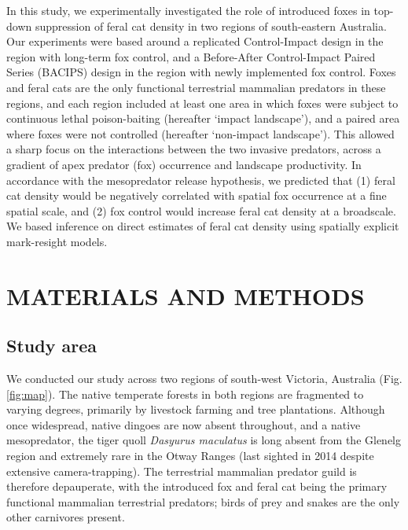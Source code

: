 \documentclass[]{elsarticle} %
\begin{document}
In this study, we experimentally investigated the role of introduced foxes in top-down suppression of feral cat density in two regions of south-eastern Australia. Our experiments were based around a replicated Control-Impact design in the region with long-term fox control, and a Before-After Control-Impact Paired Series (BACIPS) design in the region with newly implemented fox control. Foxes and feral cats are the only functional terrestrial mammalian predators in these regions, and each region included at least one area in which foxes were subject to continuous lethal poison-baiting (hereafter `impact landscape'), and a paired area where foxes were not controlled (hereafter `non-impact landscape'). This allowed a sharp focus on the interactions between the two invasive predators, across a gradient of apex predator (fox) occurrence and landscape productivity. In accordance with the mesopredator release hypothesis, we predicted that (1) feral cat density would be negatively correlated with spatial fox occurrence at a fine spatial scale, and (2) fox control would increase feral cat density at a broadscale. We based inference on direct estimates of feral cat density using spatially explicit mark-resight models.

\newpage

\hypertarget{materials-and-methods}{%
\section{MATERIALS AND METHODS}\label{materials-and-methods}}

\hypertarget{study-area}{%
\subsection{Study area}\label{study-area}}

We conducted our study across two regions of south-west Victoria, Australia (Fig. \ref{fig:map}). The native temperate forests in both regions are fragmented to varying degrees, primarily by livestock farming and tree plantations. Although once widespread, native dingoes are now absent throughout, and a native mesopredator, the tiger quoll \emph{Dasyurus maculatus} is long absent from the Glenelg region and extremely rare in the Otway Ranges (last sighted in 2014 despite extensive camera-trapping). The terrestrial mammalian predator guild is therefore depauperate, with the introduced fox and feral cat being the primary functional mammalian terrestrial predators; birds of prey and snakes are the only other carnivores present.
\end{document}
